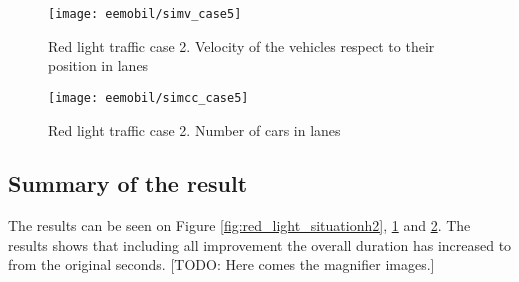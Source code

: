 			\begin{figure}
				\centering
				\texttt{[image: eemobil/simv\_case5]}
				\caption{Red light traffic case 2. Velocity of the vehicles respect to their position in lanes}
				\label{fig:red_light_situationv2}
			\end{figure}
			\begin{figure}
				\centering
				\texttt{[image: eemobil/simcc\_case5]}
				\caption{Red light traffic case 2. Number of cars in lanes }
				\label{fig:red_light_situationcc2}
			\end{figure}
			\subsection*{Summary of the result}
			The results can be seen on Figure \ref{fig:red_light_situationh2}, \ref{fig:red_light_situationv2} and \ref{fig:red_light_situationcc2}. The results shows that including all improvement the overall duration has increased to from the original seconds.
			[TODO: Here comes the magnifier images.]